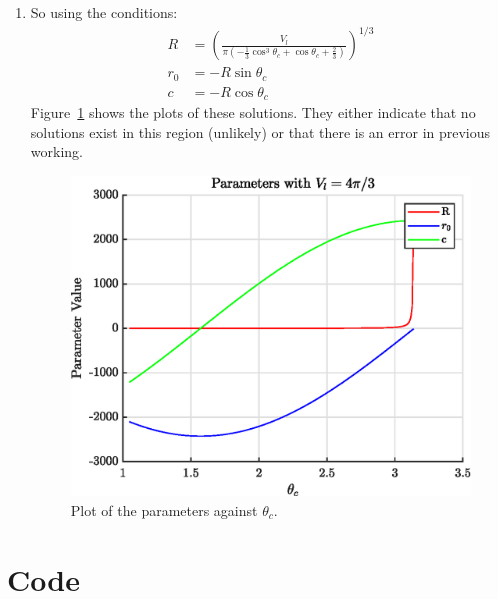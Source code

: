 \documentclass{X:/Documents/Coding/Latex/myassignment}
\begin{document}
\begin{enumerate}
\begin{enumerate}
	\item 
	So using the conditions:
	\begin{align*}
	 	R &= \left(\frac{V_l}{\pi\left(-\frac13 \cos^3 \theta_c +\cos\theta_c + \frac23\right)}\right)^{1/3}\\
		r_0 &= - R\sin\theta_c\\
		c &= - R\cos\theta_c
	\end{align*}
	Figure~\ref{fig:q3d} shows the plots of these solutions. They either indicate that no solutions exist in this region (unlikely) or that there is an error in previous working.
	\begin{figure}[tbh]
		\centering
		\includegraphics[width = 0.8\linewidth]{A5Q3d}
		\caption{Plot of the parameters against $\theta_c$.}
		\label{fig:q3d}
	\end{figure}
\end{enumerate}
\end{enumerate}
\section*{Code}



\end{document}
